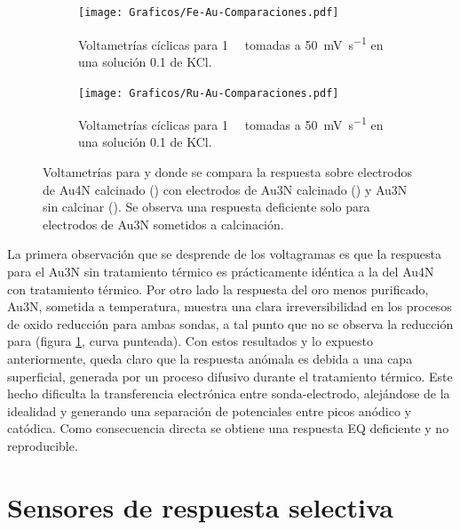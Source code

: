 {				\begin{figure}[ht]
		 	      \begin{subfigure}[t]{0.495\textwidth}
		          	\texttt{[image: Graficos/Fe-Au-Comparaciones.pdf]}
		         	\caption{Voltametrías cíclicas para \fe\space \SI{1}{\milli\Molar} tomadas a \SI{50}{\milli\volt\per\second} en una solución \SI{0.1}{\Molar} de KCl.}
		          	\label{fig:Fe-Au-compa}
		      		\end{subfigure}
		      	 \begin{subfigure}[t]{0.495\textwidth}
		          	\texttt{[image: Graficos/Ru-Au-Comparaciones.pdf]}
		         	\caption{Voltametrías cíclicas para \ru\space \SI{1}{\milli\Molar} tomadas a \SI{50}{\milli\volt\per\second} en una solución \SI{0.1}{\Molar} de KCl.}
		          	\label{fig:Ru-Au-compa}
		      		\end{subfigure}
		      	 \caption[Comparación entre electrodos calcinados y sin calcinar]{Voltametrías para \ferroferri\space y \aminorutenio\space donde se compara la respuesta sobre electrodos de Au4N calcinado (\usebox{\negro}) con electrodos de Au3N calcinado (\usebox{\punteado}) y Au3N sin calcinar (\usebox{\rojo}). Se observa una respuesta deficiente solo para electrodos de Au3N sometidos a calcinación.}
		      	 \label{Fig:Comparacion-Au}
	      		 \end{figure}	

			La primera observación que se desprende de los voltagramas es que la respuesta para el Au3N sin tratamiento térmico es prácticamente idéntica a la del Au4N con tratamiento térmico. Por otro lado la respuesta del oro menos purificado, Au3N, sometida a temperatura, muestra una clara irreversibilidad en los procesos de oxido reducción para ambas sondas, a tal punto que no se observa la reducción para \ferroferri\space (figura \ref{fig:Fe-Au-compa}, curva punteada). Con estos resultados y lo expuesto anteriormente, queda claro que la respuesta anómala es debida a una capa superficial, generada por un proceso difusivo durante el tratamiento térmico. Este hecho dificulta la transferencia electrónica entre sonda-electrodo, alejándose de la idealidad y generando una separación de potenciales entre picos anódico y catódica. Como consecuencia directa se obtiene una respuesta EQ deficiente y no reproducible.  

\section{Sensores de respuesta selectiva}

}
